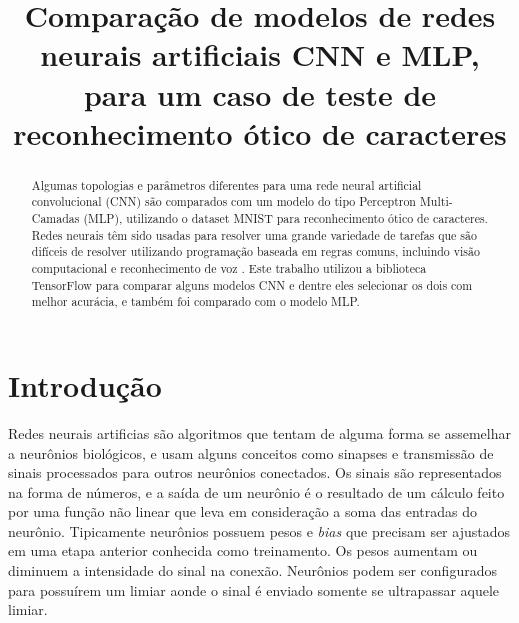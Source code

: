 \documentclass[sigconf, nonacm, screen]{acmart}
\begin{document}
\title{Comparação de modelos de redes neurais artificiais CNN e MLP, para um caso de teste de reconhecimento ótico de caracteres}

\begin{abstract}
Algumas topologias e parâmetros diferentes para uma rede neural artificial convolucional (CNN) são comparados com um modelo do tipo Perceptron Multi-Camadas (MLP), utilizando o dataset MNIST para reconhecimento ótico de caracteres. Redes neurais têm sido usadas para resolver uma grande variedade de tarefas que são difíceis de resolver utilizando programação baseada em regras comuns, incluindo visão computacional e reconhecimento de voz \cite{TF}. Este trabalho utilizou a biblioteca TensorFlow para comparar alguns modelos CNN e dentre eles selecionar os dois com melhor acurácia, e também foi comparado com o modelo MLP.
\end{abstract}


\maketitle

\section{Introdução}
\label{sec:introduction}

Redes neurais artificias são algoritmos que tentam de alguma forma se assemelhar a neurônios biológicos, e usam alguns conceitos como sinapses e transmissão de sinais processados para outros neurônios conectados. Os sinais são representados na forma de números, e a saída de um neurônio é o resultado de um cálculo feito por uma função não linear que leva em consideração a soma das entradas do neurônio. Tipicamente neurônios possuem pesos e \textit{bias} que precisam ser ajustados em uma etapa anterior conhecida como treinamento. Os pesos aumentam ou diminuem a intensidade do sinal na conexão. Neurônios podem ser configurados para possuírem um limiar aonde o sinal é enviado somente se ultrapassar aquele limiar.
\end{document}
